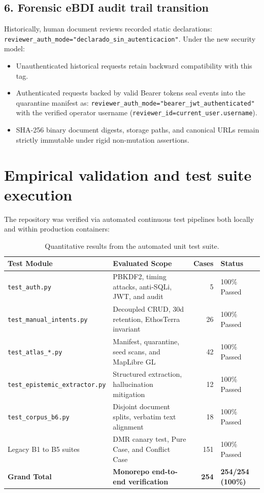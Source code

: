 \documentclass[11pt,a4paper]{article}
\begin{document}
\subsection{6. Forensic eBDI audit trail transition}
Historically, human document reviews recorded static declarations:
\texttt{reviewer\_auth\_mode="declarado\_sin\_autenticacion"}. Under the new security model:
\begin{itemize}[leftmargin=*]
    \item Unauthenticated historical requests retain backward compatibility with this tag.
    \item Authenticated requests backed by valid Bearer tokens seal events into the quarantine manifest as:
    \texttt{reviewer\_auth\_mode="bearer\_jwt\_authenticated"} with the verified operator username (\texttt{reviewer\_id=current\_user.username}).
    \item SHA-256 binary document digests, storage paths, and canonical URLs remain strictly immutable under rigid non-mutation assertions.
\end{itemize}

\section{Empirical validation and test suite execution}

The repository was verified via automated continuous test pipelines both locally and within production containers:

\begin{table}[H]
\centering
\small
\caption{Quantitative results from the automated unit test suite.}
\label{tab:tests_en}
\begin{tabularx}{\textwidth}{lp{6.0cm}rX}
\toprule
\textbf{Test Module} & \textbf{Evaluated Scope} & \textbf{Cases} & \textbf{Status} \\
\midrule
\texttt{test\_auth.py} & PBKDF2, timing attacks, anti-SQLi, JWT, and audit & 5 & 100\% Passed \\
\texttt{test\_manual\_intents.py} & Decoupled CRUD, 30d retention, EthosTerra invariant & 26 & 100\% Passed \\
\texttt{test\_atlas\_*.py} & Manifest, quarantine, seed scans, and MapLibre GL & 42 & 100\% Passed \\
\texttt{test\_epistemic\_extractor.py} & Structured extraction, hallucination mitigation & 12 & 100\% Passed \\
\texttt{test\_corpus\_b6.py} & Disjoint document splits, verbatim text alignment & 18 & 100\% Passed \\
Legacy B1 to B5 suites & DMR canary test, Pure Case, and Conflict Case & 151 & 100\% Passed \\
\midrule
\textbf{Grand Total} & \textbf{Monorepo end-to-end verification} & \textbf{254} & \textbf{254/254 (100\%)} \\
\bottomrule
\end{tabularx}
\end{table}
\end{document}
